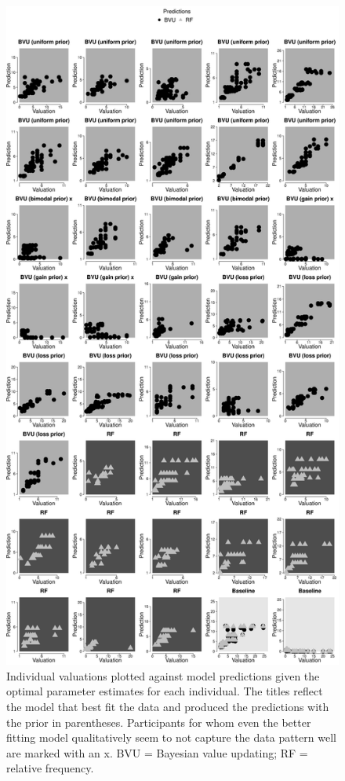 \documentclass[a4paper, man, natbib, floatsintext]{apa6} %
\begin{document}
\begin{figure}[htbp] 
  \centering
\includegraphics[height = .8\textheight, keepaspectratio]{indqual1.eps}%
    \caption{Individual valuations plotted against model predictions given the optimal parameter estimates for each individual. The titles reflect the model that best fit the data and produced the predictions with the prior in parentheses. Participants for whom even the better fitting model qualitatively seem to not capture the data pattern well are marked with an x. BVU = Bayesian value updating; RF = relative frequency.}
  \label{fig:ind.fits1}
\end{figure}
\end{document}

